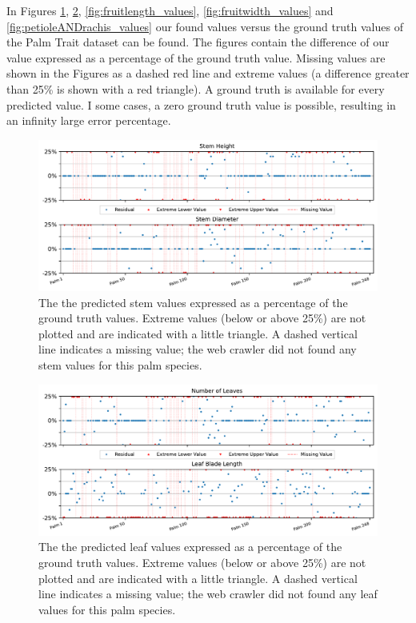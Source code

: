 \documentclass[a4paper, 12pt, oneside]{book} %
\begin{document}
In Figures \ref{fig:stem_values}, \ref{fig:leaf_values}, \ref{fig:fruitlength_values}, \ref{fig:fruitwidth_values} and \ref{fig:petioleANDrachis_values} our found values versus the ground truth values of the Palm Trait dataset can be found.
The figures contain the difference of our value expressed as a percentage of the ground truth value.
Missing values are shown in the Figures as a dashed red line and extreme values (a difference greater than 25\% is shown with a red triangle).
A ground truth is available for every predicted value.
I some cases, a zero ground truth value is possible, resulting in an infinity large error percentage.

\begin{figure}[htpb]
    \centering
    \includegraphics[width=1\textwidth]{figures/stem_values.pdf}
    \caption[Stem values ground truth vs predicted]{The the predicted stem values expressed as a percentage of the ground truth values. Extreme values (below or above 25\%) are not plotted and are indicated with a little triangle. A dashed vertical line indicates a missing value; the web crawler did not found any stem values for this palm species.}
    \label{fig:stem_values}
\end{figure}

\begin{figure}[htpb]
    \centering
    \includegraphics[width=1\textwidth]{figures/leaf_values.pdf}
    \caption[Leaf values ground truth vs predicted]{The the predicted leaf values expressed as a percentage of the ground truth values. Extreme values (below or above 25\%) are not plotted and are indicated with a little triangle. A dashed vertical line indicates a missing value; the web crawler did not found any leaf values for this palm species.}
    \label{fig:leaf_values}
\end{figure}
\end{document}

